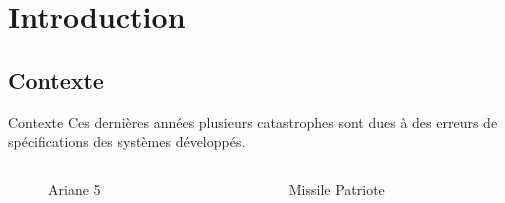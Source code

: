 \section{Introduction}
\subsection{Contexte}
\begin{frame}{Contexte}
Ces dernières années plusieurs catastrophes sont dues à des erreurs de spécifications des systèmes développés.
\begin{columns}
	\begin{column}{0.3\textwidth}
		\begin{figure}
			{  
				\caption{Ariane 5}
			}
		\end{figure}
	\end{column}

	\begin{column}{0.3\textwidth}
	\begin{figure}
		{  
			\caption{Missile Patriote}
		}
	\end{figure}
\end{column}


\end{columns}
\end{frame}
